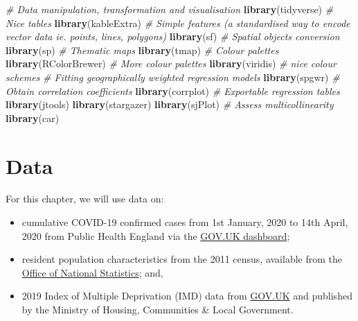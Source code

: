 \documentclass[
]{book}
\newenvironment{Shaded}{\begin{snugshade}}{\end{snugshade}}
\newcommand{\CommentTok}[1]{\textcolor[rgb]{0.56,0.35,0.01}{\textit{#1}}}
\newcommand{\KeywordTok}[1]{\textcolor[rgb]{0.13,0.29,0.53}{\textbf{#1}}}
\newcommand{\NormalTok}[1]{#1}
\begin{document}
\begin{Shaded}
\begin{Highlighting}[]
\CommentTok{# Data manipulation, transformation and visualisation}
\KeywordTok{library}\NormalTok{(tidyverse)}
\CommentTok{# Nice tables}
\KeywordTok{library}\NormalTok{(kableExtra)}
\CommentTok{# Simple features (a standardised way to encode vector data ie. points, lines, polygons)}
\KeywordTok{library}\NormalTok{(sf) }
\CommentTok{# Spatial objects conversion}
\KeywordTok{library}\NormalTok{(sp) }
\CommentTok{# Thematic maps}
\KeywordTok{library}\NormalTok{(tmap) }
\CommentTok{# Colour palettes}
\KeywordTok{library}\NormalTok{(RColorBrewer) }
\CommentTok{# More colour palettes}
\KeywordTok{library}\NormalTok{(viridis) }\CommentTok{# nice colour schemes}
\CommentTok{# Fitting geographically weighted regression models}
\KeywordTok{library}\NormalTok{(spgwr)}
\CommentTok{# Obtain correlation coefficients}
\KeywordTok{library}\NormalTok{(corrplot)}
\CommentTok{# Exportable regression tables}
\KeywordTok{library}\NormalTok{(jtools)}
\KeywordTok{library}\NormalTok{(stargazer)}
\KeywordTok{library}\NormalTok{(sjPlot)}
\CommentTok{# Assess multicollinearity}
\KeywordTok{library}\NormalTok{(car)}
\end{Highlighting}
\end{Shaded}

\hypertarget{data-5}{%
\section{Data}\label{data-5}}

For this chapter, we will use data on:

\begin{itemize}
\item
  cumulative COVID-19 confirmed cases from 1st January, 2020 to 14th April, 2020 from Public Health England via the \href{https://coronavirus.data.gov.uk}{GOV.UK dashboard};
\item
  resident population characteristics from the 2011 census, available from the \href{https://www.nomisweb.co.uk/home/census2001.asp}{Office of National Statistics}; and,
\item
  2019 Index of Multiple Deprivation (IMD) data from \href{https://www.gov.uk/government/statistics/english-indices-of-deprivation-2019}{GOV.UK} and published by the Ministry of Housing, Communities \& Local Government.
\end{itemize}
\end{document}
